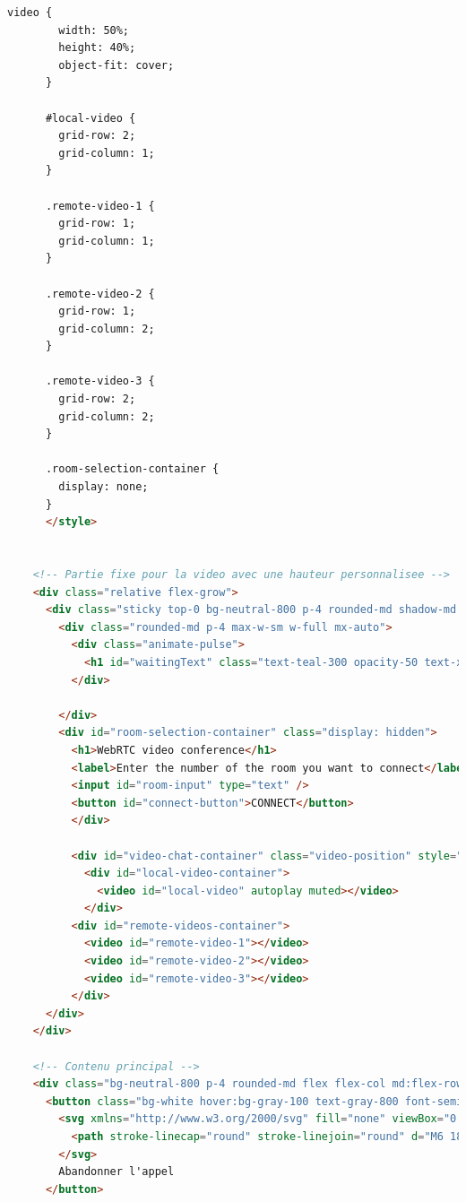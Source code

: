 \documentclass[12pt, a4paper, oneside]{article}
\begin{document}
\begin{lstlisting}[language=HTML, caption={Page - Réunions}, label=Page - Reunions]
      video {
        width: 50%;
        height: 40%;
        object-fit: cover;
      }
    
      #local-video {
        grid-row: 2;
        grid-column: 1;
      }
    
      .remote-video-1 {
        grid-row: 1;
        grid-column: 1;
      }
    
      .remote-video-2 {
        grid-row: 1;
        grid-column: 2;
      }
    
      .remote-video-3 {
        grid-row: 2;
        grid-column: 2;
      }
  
      .room-selection-container {
        display: none;
      }
      </style>
  
  
    <!-- Partie fixe pour la video avec une hauteur personnalisee -->
    <div class="relative flex-grow">
      <div class="sticky top-0 bg-neutral-800 p-4 rounded-md shadow-md h-16 my-8 min-h-[300px] flex items-center justify-center">
        <div class="rounded-md p-4 max-w-sm w-full mx-auto">
          <div class="animate-pulse">
            <h1 id="waitingText" class="text-teal-300 opacity-50 text-xl text-center">En attente de la connexion a la reunion</h1>
          </div>
  
        </div>
        <div id="room-selection-container" class="display: hidden">
          <h1>WebRTC video conference</h1>
          <label>Enter the number of the room you want to connect</label>
          <input id="room-input" type="text" />
          <button id="connect-button">CONNECT</button>
          </div>
        
          <div id="video-chat-container" class="video-position" style="display: none">
            <div id="local-video-container">
              <video id="local-video" autoplay muted></video>
            </div>
          <div id="remote-videos-container">
            <video id="remote-video-1"></video>
            <video id="remote-video-2"></video>
            <video id="remote-video-3"></video>
          </div>
      </div>
    </div>
  
    <!-- Contenu principal -->
    <div class="bg-neutral-800 p-4 rounded-md flex flex-col md:flex-row justify-center items-center space-y-4 md:space-y-0 md:space-x-8" data-astro-cid-j7pv25f6="">
      <button class="bg-white hover:bg-gray-100 text-gray-800 font-semibold py-2 px-4 border border-gray-400 rounded shadow flex items-center" id="hangup-button" data-astro-cid-j7pv25f6="">
        <svg xmlns="http://www.w3.org/2000/svg" fill="none" viewBox="0 0 24 24" stroke-width="1.5" stroke="currentColor" class="w-6 h-6 mr-2" data-astro-cid-j7pv25f6="">
          <path stroke-linecap="round" stroke-linejoin="round" d="M6 18L18 6M6 6l12 12" data-astro-cid-j7pv25f6=""></path>
        </svg>
        Abandonner l'appel
      </button>
    

\end{lstlisting}
\end{document}
